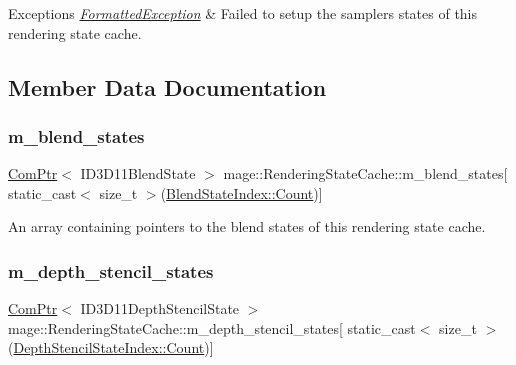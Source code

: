 \begin{DoxyExceptions}{Exceptions}
{\em \hyperlink{structmage_1_1_formatted_exception}{Formatted\+Exception}} & Failed to setup the samplers states of this rendering state cache. \\
\hline
\end{DoxyExceptions}


\subsection{Member Data Documentation}
\hypertarget{structmage_1_1_rendering_state_cache_a1768aee030cb280918908996336a93af}{}\label{structmage_1_1_rendering_state_cache_a1768aee030cb280918908996336a93af} 
\subsubsection{\texorpdfstring{m\+\_\+blend\+\_\+states}{m\_blend\_states}}
{\footnotesize\ttfamily \hyperlink{namespacemage_ae74f374780900893caa5555d1031fd79}{Com\+Ptr}$<$ I\+D3\+D11\+Blend\+State $>$ mage\+::\+Rendering\+State\+Cache\+::m\+\_\+blend\+\_\+states\mbox{[} static\+\_\+cast$<$ size\+\_\+t $>$(\hyperlink{structmage_1_1_rendering_state_cache_af1d994cc6a3134ded0b24353de5686d0ae93f994f01c537c4e2f7d8528c3eb5e9}{Blend\+State\+Index\+::\+Count})\mbox{]}\hspace{0.3cm}{\ttfamily [private]}}

An array containing pointers to the blend states of this rendering state cache. \hypertarget{structmage_1_1_rendering_state_cache_a749b6533a318438e309b7ae462e8537f}{}\label{structmage_1_1_rendering_state_cache_a749b6533a318438e309b7ae462e8537f} 
\subsubsection{\texorpdfstring{m\+\_\+depth\+\_\+stencil\+\_\+states}{m\_depth\_stencil\_states}}
{\footnotesize\ttfamily \hyperlink{namespacemage_ae74f374780900893caa5555d1031fd79}{Com\+Ptr}$<$ I\+D3\+D11\+Depth\+Stencil\+State $>$ mage\+::\+Rendering\+State\+Cache\+::m\+\_\+depth\+\_\+stencil\+\_\+states\mbox{[} static\+\_\+cast$<$ size\+\_\+t $>$(\hyperlink{structmage_1_1_rendering_state_cache_af6e27c63442c684390b23b6a85020f15ae93f994f01c537c4e2f7d8528c3eb5e9}{Depth\+Stencil\+State\+Index\+::\+Count})\mbox{]}\hspace{0.3cm}{\ttfamily [private]}}

